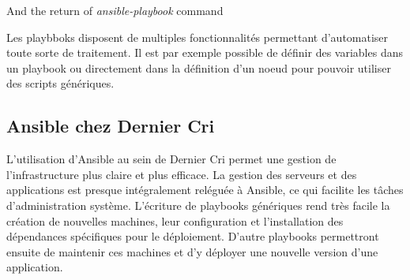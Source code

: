 \begin{Shaded}
\begin{Highlighting}[]

\KeywordTok{-}  
    \KeywordTok{-}  
       
       
\end{Highlighting}
\end{Shaded}

And the return of \emph{ansible-playbook} command

\bigskip

\begin{Shaded}
\begin{Highlighting}[]
 \NormalTok{**********************************************************}

 \NormalTok{[setup] **************************************************}

 

 
       
\end{Highlighting}
\end{Shaded}

\bigskip

Les playbboks disposent de multiples fonctionnalités permettant
d'automatiser toute sorte de traitement. Il est par exemple possible de
définir des variables dans un playbook ou directement dans la définition
d'un noeud pour pouvoir utiliser des scripts génériques.

\newpage

\subsection{Ansible chez Dernier Cri}\label{ansible-chez-dernier-cri}

\bigskip

L'utilisation d'Ansible au sein de Dernier Cri permet une gestion de
l'infrastructure plus claire et plus efficace. La gestion des serveurs
et des applications est presque intégralement reléguée à Ansible, ce qui
facilite les tâches d'administration système. L'écriture de playbooks
génériques rend très facile la création de nouvelles machines, leur
configuration et l'installation des dépendances spécifiques pour le
déploiement. D'autre playbooks permettront ensuite de maintenir ces
machines et d'y déployer une nouvelle version d'une application.

